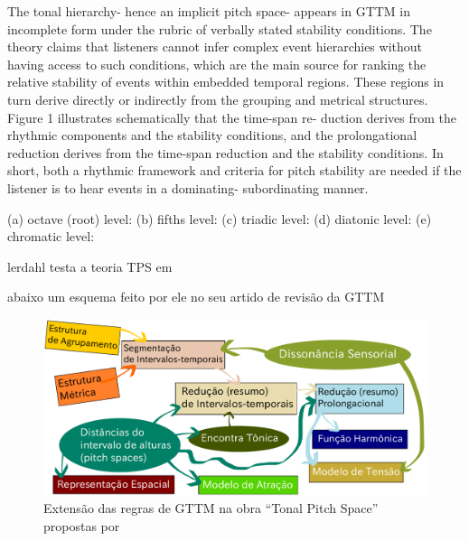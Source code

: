\documentclass[
	12pt,				%
	openright,			%
	twoside,			%
	a4paper,			%
	english,			%
	french,				%
	spanish,			%
	brazil				%
	]{abntex2}
\begin{document}
The tonal hierarchy- hence an implicit pitch space- appears in GTTM
in incomplete form under the rubric of verbally stated stability conditions.
The theory claims that listeners cannot infer complex event hierarchies
without having access to such conditions, which are the main source for
ranking the relative stability of events within embedded temporal regions.
These regions in turn derive directly or indirectly from the grouping and
metrical structures. Figure 1 illustrates schematically that the time-span re-
duction derives from the rhythmic components and the stability conditions,
and the prolongational reduction derives from the time-span reduction and
the stability conditions. In short, both a rhythmic framework and criteria
for pitch stability are needed if the listener is to hear events in a dominating-
subordinating manner.\cite{lerdahl1988tps}


(a) octave (root) level:
(b) fifths level:
(c) triadic level:
(d) diatonic level:
(e) chromatic level:





lerdahl testa a teoria TPS em \cite{2007lerdahl-krumhansl}







abaixo um esquema feito por ele no seu artido de revisão da GTTM
\begin{figure}[!h]
	\caption{\label{fig_grafico}Extensão das regras de GTTM na obra “Tonal Pitch Space” propostas por  }
	\begin{center}
	    \includegraphics[scale=0.5]{gttm/GTTM_TPS_rules.pdf}
	\end{center}
\end{figure}
\end{document}
